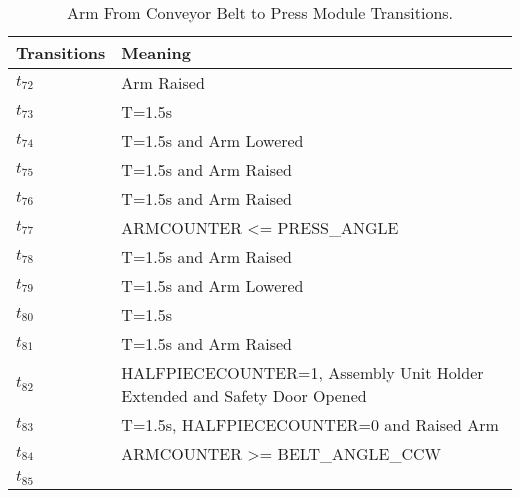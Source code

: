\begin{table}[H]
\caption{Arm From Conveyor Belt to Press Module Transitions.}
\centering
\begin{tabular}{M{5cm}M{10cm}}
Transitions & Meaning\\
\hline
\hyperlink{partialNet:t72}{\hypertarget{partialTable:t72}{$t_{72}$}} & Arm Raised\\
\hyperlink{partialNet:tt73}{\hypertarget{partialTable:tt73}{$t_{73}$}} & T=1.5s\\
\hyperlink{partialNet:tt74}{\hypertarget{partialTable:tt74}{$t_{74}$}} & T=1.5s and Arm Lowered\\
\hyperlink{partialNet:tt75}{\hypertarget{partialTable:tt75}{$t_{75}$}} & T=1.5s and Arm Raised\\
\hyperlink{partialNet:tt76}{\hypertarget{partialTable:tt76}{$t_{76}$}} & T=1.5s and Arm Raised\\
\hyperlink{partialNet:t77}{\hypertarget{partialTable:t77}{$t_{77}$}} & ARMCOUNTER <= PRESS_ANGLE\\
\hyperlink{partialNet:tt78}{\hypertarget{partialTable:tt78}{$t_{78}$}} & T=1.5s and Arm Raised\\
\hyperlink{partialNet:tt79}{\hypertarget{partialTable:tt79}{$t_{79}$}} & T=1.5s and Arm Lowered\\
\hyperlink{partialNet:tt80}{\hypertarget{partialTable:tt80}{$t_{80}$}} & T=1.5s\\
\hyperlink{partialNet:tt81}{\hypertarget{partialTable:tt81}{$t_{81}$}} & T=1.5s and Arm Raised\\
\hyperlink{partialNet:t82}{\hypertarget{partialTable:t82}{$t_{82}$}} & HALFPIECECOUNTER=1, Assembly Unit Holder Extended and Safety Door Opened\\
\hyperlink{partialNet:tt83}{\hypertarget{partialTable:tt83}{$t_{83}$}} & T=1.5s, HALFPIECECOUNTER=0 and Raised Arm\\
\hyperlink{partialNet:t84}{\hypertarget{partialTable:t84}{$t_{84}$}} & ARMCOUNTER >= BELT_ANGLE_CCW\\
\hyperlink{partialNet:t85}{\hypertarget{partialTable:t85}{$t_{85}$}} & \\
\end{tabular}
\end{table}
